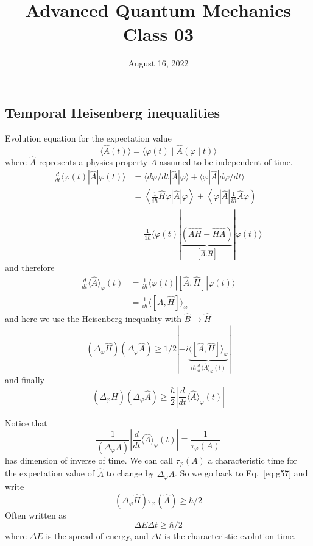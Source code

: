 \documentclass[12pt]{article}
\title{Advanced Quantum Mechanics\\Class 03}
\date{August 16, 2022}                                           %
\newcommand{\be}{\begin{equation}}
\newcommand{\ee}{\end{equation}}
\begin{document}
\maketitle

\setcounter{section}{3}
\setcounter{subsection}{4}
\setcounter{equation}{54}


\subsection{Temporal Heisenberg inequalities}


Evolution equation for the expectation value
\be
\langle\hat{A}(t)\rangle=\langle\varphi(t) \mid \hat{A}(\varphi \mid t)\rangle
\ee
where $\hat{A}$ represents a physics property $A$
assumed to be independent of time.
\[
\begin{aligned} \frac{d}{d t}\langle\varphi(t)|\hat{A}| \varphi(t)\rangle 
&=\langle d \varphi / d t|\hat{A}| \varphi\rangle+\langle\varphi|\hat{A}| d \varphi / d t\rangle \\ &=\left\langle\frac{1}{i \hbar} \hat{H} \varphi|\hat{A}| \varphi\right\rangle+\left\langle\varphi|\hat{A}| \frac{1}{i \hbar} \hat{A} \varphi\right) \\ 
&=\frac{1}{1 \hbar}\langle\varphi(t)|
\underbrace{(\hat{A}\hat{H}-\hat{H}\hat{A})}%
_{[\hat{A},\hat{H}]}
|\varphi(t)\rangle
\end{aligned}
\]
and therefore
\be
\begin{aligned} 
\frac{d}{d t}\langle\hat{A}\rangle_{\varphi}(t) &=\frac{1}{i \hbar}\langle\varphi(t)|[\hat{A}, \hat{H}]| \varphi(t)\rangle \\ &=\frac{1}{i \hbar}\langle[A, \hat{H}]\rangle_{\varphi} 
\end{aligned}
\ee
and here we use the Heisenberg inequality with $\hat{B} \to \hat{H}$
\[
\left(\Delta_{\varphi} \hat{H}\right)\left(\Delta_{\varphi} \hat{A}\right) \geqslant 
1 / 2|-i
\underbrace{\langle[\hat{A}, \hat{H}]\rangle_{\varphi}}%
_{i \hbar \frac{d}{d t}\langle\hat{A}\rangle_{\varphi}(t)}
|
\]
and finally
\be
\boxed{
\left(\Delta_{\varphi} \hat{H}\right)\left(\Delta_{\varphi} \hat{A}\right) \geqslant \frac{\hbar}{2}\left|\frac{d}{d t}\langle\hat{A}\rangle_{\varphi}(t)\right|
\label{eq:g57}
}
\ee

Notice that
\be
\frac{1}{(\Delta_{\varphi} A)}\left|\frac{d}{d t}\langle\hat{A}\rangle_{\varphi}(t)\right| 
\equiv 
\frac{1}{\tau_\varphi(A)}
\ee
has dimension of inverse of time.
We can call $\tau_\varphi(A)$ a characteristic time for the
expectation value of $\hat{A}$ to change 
by $\Delta_{\varphi} A$.
So we go back to Eq.~\ref{eq:g57} and write
\be
\boxed{
\left(\Delta_{\varphi} \hat{H}\right) \tau_{\varphi}(\hat{A}) \geq \hbar / 2
}
\ee
Often written as 
\be
\Delta E \Delta t \geq \hbar / 2
\ee
where
$\Delta E$ is the spread of energy, and 
$\Delta t$ is the characteristic evolution time.
\end{document}
